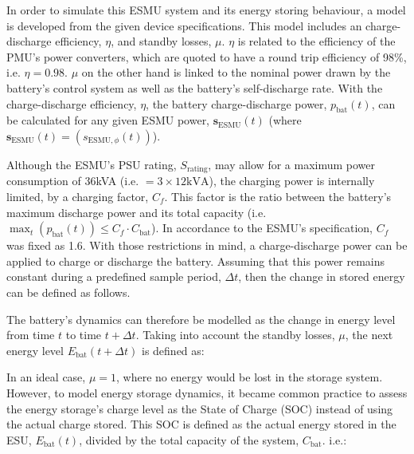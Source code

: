 In order to simulate this ESMU system and its energy storing behaviour, a model is developed from the given device specifications.
This model includes an charge-discharge efficiency, $\eta$, and standby losses, $\mu$.
$\eta$ is related to the efficiency of the PMU's power converters, which are quoted to have a round trip efficiency of 98\%, i.e. $\eta = 0.98$.
$\mu$ on the other hand is linked to the nominal power drawn by the battery's control system as well as the battery's self-discharge rate.
With the charge-discharge efficiency, $\eta$, the battery charge-discharge power, $p_\text{bat}(t)$, can be calculated for any given ESMU power, $\textbf{s}_\text{ESMU}(t)$ (where $\textbf{s}_\text{ESMU}(t) = (s_{\text{ESMU},\phi}(t))$).




Although the ESMU's PSU rating, $S_\text{rating}$, may allow for a maximum power consumption of 36kVA (i.e. $=3\times12\text{kVA}$), the charging power is internally limited, by a charging factor, $C_f$.
This factor is the ratio between the battery's maximum discharge power and its total capacity (i.e. $\max_t (p_\text{bat}(t)) \leq C_f \cdot C_\text{bat}$).
In accordance to the ESMU's specification, $C_f$ was fixed as 1.6.
With those restrictions in mind, a charge-discharge power can be applied to charge or discharge the battery.
Assuming that this power remains constant during a predefined sample period, $\Delta t$, then the change in stored energy can be defined as follows.



\nomenclature[I]{$\mu$}{Self-discharge losses of battery, where $\mu \in (0, 1]$ (Chapter \ref{ch1})}

The battery's dynamics can therefore be modelled as the change in energy level from time $t$ to time $t+\Delta t$.
Taking into account the standby losses, $\mu$, the next energy level $E_\text{bat}(t+\Delta t)$ is defined as:



In an ideal case, $\mu = 1$, where no energy would be lost in the storage system.
However, to model energy storage dynamics, it became common practice to assess the energy storage's charge level as the State of Charge (SOC) instead of using the actual charge stored.
This SOC is defined as the actual energy stored in the ESU, $E_\text{bat}(t)$, divided by the total capacity of the system, $C_\text{bat}$. i.e.:

